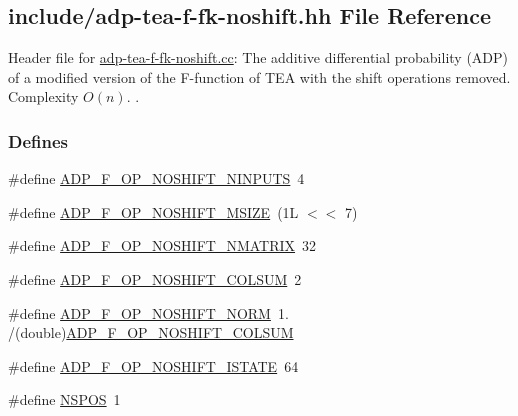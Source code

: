 \hypertarget{adp-tea-f-fk-noshift_8hh}{\subsection{include/adp-\/tea-\/f-\/fk-\/noshift.hh \-File \-Reference}
\label{adp-tea-f-fk-noshift_8hh}
}


\-Header file for \hyperlink{adp-tea-f-fk-noshift_8cc}{adp-\/tea-\/f-\/fk-\/noshift.\-cc}\-: \-The additive differential probability (\-A\-D\-P) of a modified version of the \-F-\/function of \-T\-E\-A with the shift operations removed. \-Complexity $O(n)$. .  


\subsubsection*{\-Defines}
\begin{DoxyCompactItemize}
\item 
\#define \hyperlink{adp-tea-f-fk-noshift_8hh_a8b9d4e17f9cf8d7981f60b102705a9e1}{\-A\-D\-P\-\_\-\-F\-\_\-\-O\-P\-\_\-\-N\-O\-S\-H\-I\-F\-T\-\_\-\-N\-I\-N\-P\-U\-T\-S}~4
\item 
\#define \hyperlink{adp-tea-f-fk-noshift_8hh_a5f64f68dea618335ccaed1fdeead5596}{\-A\-D\-P\-\_\-\-F\-\_\-\-O\-P\-\_\-\-N\-O\-S\-H\-I\-F\-T\-\_\-\-M\-S\-I\-Z\-E}~(1\-L $<$$<$ 7)
\item 
\#define \hyperlink{adp-tea-f-fk-noshift_8hh_a3a5ec360433b218da1fcb02bdec1f9ac}{\-A\-D\-P\-\_\-\-F\-\_\-\-O\-P\-\_\-\-N\-O\-S\-H\-I\-F\-T\-\_\-\-N\-M\-A\-T\-R\-I\-X}~32
\item 
\#define \hyperlink{adp-tea-f-fk-noshift_8hh_af415797182c8628abe91c502d37a5658}{\-A\-D\-P\-\_\-\-F\-\_\-\-O\-P\-\_\-\-N\-O\-S\-H\-I\-F\-T\-\_\-\-C\-O\-L\-S\-U\-M}~2
\item 
\#define \hyperlink{adp-tea-f-fk-noshift_8hh_a8e0db13dd0cbef7125af850c9fc25ad9}{\-A\-D\-P\-\_\-\-F\-\_\-\-O\-P\-\_\-\-N\-O\-S\-H\-I\-F\-T\-\_\-\-N\-O\-R\-M}~1. /(double)\hyperlink{adp-tea-f-fk-noshift_8hh_af415797182c8628abe91c502d37a5658}{\-A\-D\-P\-\_\-\-F\-\_\-\-O\-P\-\_\-\-N\-O\-S\-H\-I\-F\-T\-\_\-\-C\-O\-L\-S\-U\-M}
\item 
\#define \hyperlink{adp-tea-f-fk-noshift_8hh_a299904aed650e7b3a81f84077b3c2162}{\-A\-D\-P\-\_\-\-F\-\_\-\-O\-P\-\_\-\-N\-O\-S\-H\-I\-F\-T\-\_\-\-I\-S\-T\-A\-T\-E}~64
\item 
\#define \hyperlink{adp-tea-f-fk-noshift_8hh_a4822a46657916694abfee9a1c1cdd137}{\-N\-S\-P\-O\-S}~1
\end{DoxyCompactItemize}
